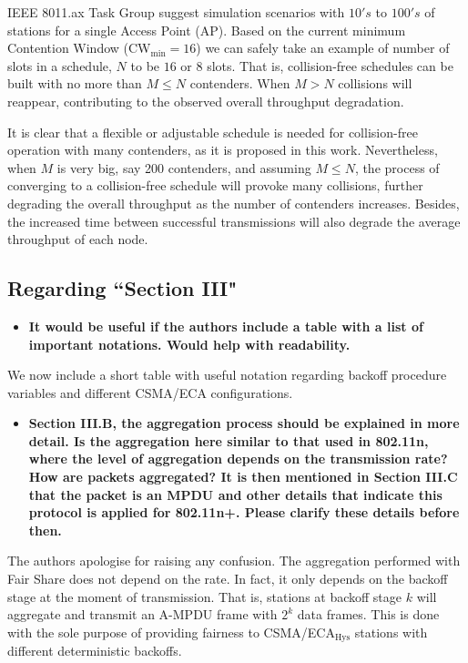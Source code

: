 \documentclass[]{article}
\begin{document}
		IEEE 8011.ax Task Group suggest simulation scenarios with $10's$ to $100's$ of stations for a single Access Point (AP). Based on the current minimum Contention Window (CW$_{\min}=16$) we can safely take an example of number of slots in a schedule, $N$ to be $16$ or $8$ slots. That is, collision-free schedules can be built with no more than $M\leq N$ contenders. When $M>N$ collisions will reappear, contributing to the observed overall throughput degradation. 
		
		It is clear that a flexible or adjustable schedule is needed for collision-free operation with many contenders, as it is proposed in this work. Nevertheless, when $M$ is very big, say 200 contenders, and assuming $M\leq N$, the process of converging to a collision-free schedule will provoke many collisions, further degrading the overall throughput as the number of contenders increases. Besides, the increased time between successful transmissions will also degrade the average throughput of each node.

	\subsection{Regarding ``Section III"}
		\begin{itemize}
			\item {\bf It would be useful if the authors include a table with a list of important notations. Would help with readability.}
		\end{itemize}

		We now include a short table with useful notation regarding backoff procedure variables and different CSMA/ECA configurations.

		\begin{itemize}
			\item {\bfseries Section III.B, the aggregation process should be explained in more detail. Is the aggregation here similar to that used in 802.11n, where the level of aggregation depends on the transmission rate? How are packets aggregated? It is then mentioned in Section III.C that the packet is an MPDU and other details that indicate this protocol is applied for 802.11n+. Please clarify these details before then.}
		\end{itemize}
		
 		The authors apologise for raising any confusion. The aggregation performed with Fair Share does not depend on the rate. In fact, it only depends on 		the backoff stage at the moment of transmission. That is, stations at backoff stage $k$ will aggregate and transmit an A-MPDU frame with $2^{k}$ 		data frames. This is done with the sole purpose of providing fairness to CSMA/ECA$_{\text{Hys}}$ stations with different deterministic backoffs.
		
\end{document}
